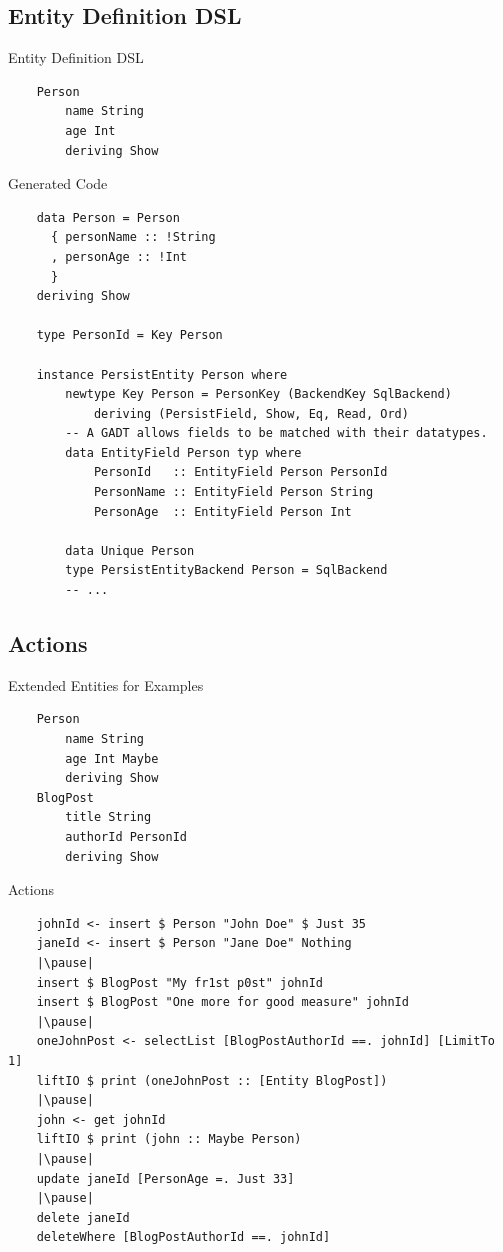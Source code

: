 \documentclass[pdf]{beamer}
\begin{document}
\subsection{Entity Definition DSL}
\begin{frame}[fragile]{Entity Definition DSL}
  \begin{verbatim}
    Person
        name String
        age Int
        deriving Show
  \end{verbatim}
\end{frame}

\begin{frame}[fragile]{Generated Code}
  \begin{verbatim}
    data Person = Person
      { personName :: !String
      , personAge :: !Int
      }
    deriving Show

    type PersonId = Key Person

    instance PersistEntity Person where
        newtype Key Person = PersonKey (BackendKey SqlBackend)
            deriving (PersistField, Show, Eq, Read, Ord)
        -- A GADT allows fields to be matched with their datatypes.
        data EntityField Person typ where
            PersonId   :: EntityField Person PersonId
            PersonName :: EntityField Person String
            PersonAge  :: EntityField Person Int

        data Unique Person
        type PersistEntityBackend Person = SqlBackend
        -- ...
  \end{verbatim}
\end{frame}

\subsection{Actions}
\begin{frame}[fragile]{Extended Entities for Examples}
  \begin{verbatim}
    Person
        name String
        age Int Maybe
        deriving Show
    BlogPost
        title String
        authorId PersonId
        deriving Show
  \end{verbatim}
\end{frame}

\begin{frame}[fragile]{Actions}
  \begin{verbatim}
    johnId <- insert $ Person "John Doe" $ Just 35
    janeId <- insert $ Person "Jane Doe" Nothing
    |\pause|
    insert $ BlogPost "My fr1st p0st" johnId
    insert $ BlogPost "One more for good measure" johnId
    |\pause|
    oneJohnPost <- selectList [BlogPostAuthorId ==. johnId] [LimitTo 1]
    liftIO $ print (oneJohnPost :: [Entity BlogPost])
    |\pause|
    john <- get johnId
    liftIO $ print (john :: Maybe Person)
    |\pause|
    update janeId [PersonAge =. Just 33]
    |\pause|
    delete janeId
    deleteWhere [BlogPostAuthorId ==. johnId]
  \end{verbatim}
\end{frame}
\end{document}
